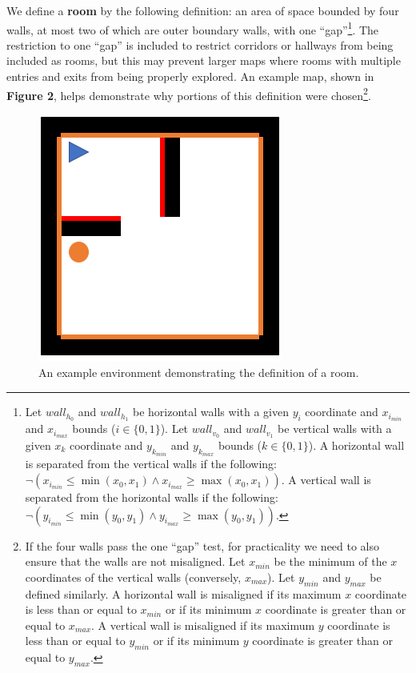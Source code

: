 \documentclass[12pt]{article}
\begin{document}
We define a \textbf{room} by the following definition: an area of space bounded by four walls, at most two of which are outer boundary walls, with one ``gap''\footnote{Let $ wall_{h_{0}} $ and $ wall_{h_{1}} $ be horizontal walls with a given $ y_{i} $ coordinate and $ x_{i_{min}} $ and $ x_{i_{max}} $ bounds ($ i \in \{0, 1\} $). Let $ wall_{v_{0}} $ and $ wall_{v_{1}} $ be vertical walls with a given $ x_{k} $ coordinate and $ y_{k_{min}} $ and $ y_{k_{max}} $ bounds ($ k \in \{0, 1\} $). A horizontal wall is separated from the vertical walls if the following: $ \neg (x_{i_{min}} \leq \min(x_{0}, x_{1}) \wedge  x_{i_{max}} \geq \max(x_{0}, x_{1})) $. A vertical wall is separated from the horizontal walls if the following: $ \neg (y_{i_{min}} \leq \min(y_{0}, y_{1}) \wedge y_{i_{max}} \geq \max(y_{0}, y_{1})) $.}. The restriction to one ``gap'' is included to restrict corridors or hallways from being included as rooms, but this may prevent larger maps where rooms with multiple entries and exits from being properly explored. An example map, shown in \textbf{Figure 2}, helps demonstrate why portions of this definition were chosen\footnote{If the four walls pass the one ``gap'' test, for practicality we need to also ensure that the walls are not misaligned. Let $ x_{min} $ be the minimum of the $ x $ coordinates of the vertical walls (conversely, $ x_{max} $). Let $ y_{min} $ and $ y_{max} $ be defined similarly. A horizontal wall is misaligned if its maximum $ x $ coordinate is less than or equal to $ x_{min} $ or if its minimum $ x $ coordinate is greater than or equal to $ x_{max} $. A vertical wall is misaligned if its maximum $ y $ coordinate is less than or equal to $ y_{min} $ or if its minimum $ y $ coordinate is greater than or equal to $ y_{max} $.}.

\begin{figure}[htbp]
\centering
\includegraphics[width=0.5\linewidth]{mapex1.PNG} 
\caption{An example environment demonstrating the definition of a room.}
\end{figure} 
\end{document}
